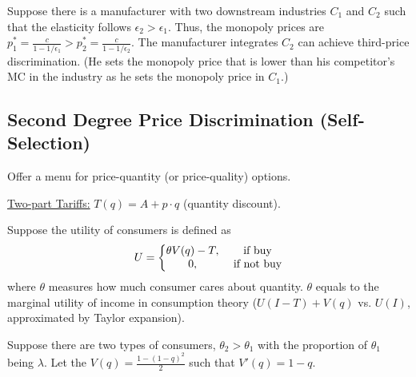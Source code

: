 \documentclass[11pt]{elegantbook}
\begin{document}
\begin{example}
    Suppose there is a manufacturer with two downstream industries $C_1$ and $C_2$ such that the elasticity follows $\epsilon_2>\epsilon_1$. Thus, the monopoly prices are $p_1^*=\frac{c}{1-1/\epsilon_1}>p_2^*=\frac{c}{1-1/\epsilon_2}$. The manufacturer integrates $C_2$ can achieve third-price discrimination. (He sets the monopoly price that is lower than his competitor's MC in the industry as he sets the monopoly price in $C_1$.)
\end{example}

\subsection{Second Degree Price Discrimination (Self-Selection)}
Offer a menu for price-quantity (or price-quality) options.

\underline{Two-part Tariffs:} $T(q)=A+p\cdot q$ (quantity discount).

Suppose the utility of consumers is defined as
\begin{equation}
    \begin{aligned}
        U=\left\{\begin{matrix}
            \theta V(q)-T,& \textnormal{ if buy}\\
            0,& \textnormal{ if not buy}
        \end{matrix}\right.
    \end{aligned}
    \nonumber
\end{equation}
where $\theta$ measures how much consumer cares about quantity. $\theta$ equals to the marginal utility of income in consumption theory ($U(I-T)+V(q)$ vs. $U(I)$, approximated by Taylor expansion).

Suppose there are two types of consumers, $\theta_2>\theta_1$ with the proportion of $\theta_1$ being $\lambda$. Let the $V(q)=\frac{1-(1-q)^2}{2}$ such that $V'(q)=1-q$.
\end{document}
